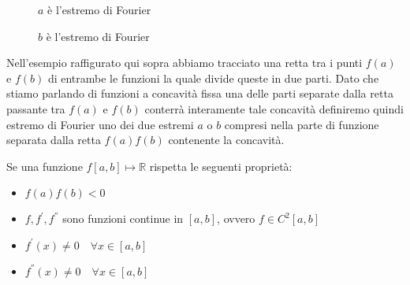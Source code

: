 \documentclass[12pt, a4paper]{book}
\theoremstyle{definition}
\begin{document}
\begin{flushleft}
\begin{figure}[h!]
\begin{minipage}{0.40\textwidth}
        \caption{$a$ è l'estremo di Fourier}
        \label{estremofa}
    \end{minipage}\hfill
    \begin{minipage}{0.40\textwidth}
        \centering
        \caption{$b$ è l'estremo di Fourier}
        \label{estremofb}
    \end{minipage}
\end{figure}

Nell'esempio raffigurato qui sopra abbiamo tracciato una retta tra i punti $f(a)$ e $f(b)$ di entrambe le funzioni la quale divide queste in due parti. Dato che stiamo parlando di funzioni a concavità fissa una delle parti separate dalla retta passante tra $f(a)$ e $f(b)$ conterrà interamente tale concavità definiremo quindi estremo di Fourier uno dei due estremi $a$ o $b$ compresi nella parte di funzione separata dalla retta $f(a)f(b)$ contenente la concavità. 

Se una funzione $f[a,b] \mapsto \mathbb{R}$ rispetta le seguenti proprietà: 
\begin{itemize}
	\item $f(a)f(b)<0$
	\item $f,f^{'},f^{''}$ sono funzioni continue in $[a,b]$, ovvero $f \in C^{2}[a,b]$  
	\item $f^{'}(x) \neq 0 \quad \forall x \in [a,b]$  
	\item $f^{''}(x) \neq 0 \quad \forall x \in [a,b]$  
\end{itemize}


\end{flushleft}
\end{document}
